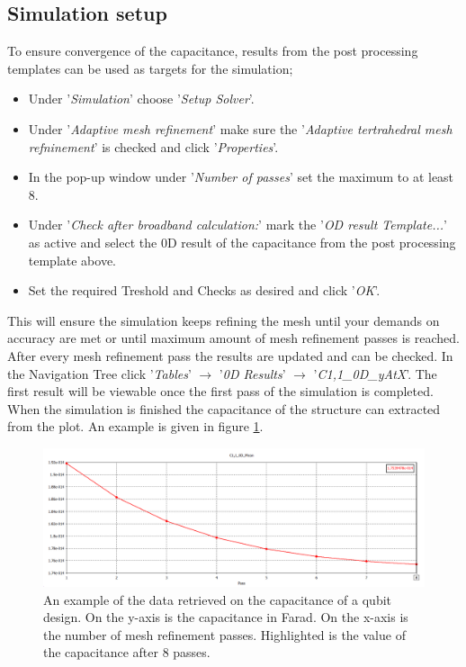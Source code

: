 \subsection{Simulation setup}
To ensure convergence of the capacitance, results from the post processing templates can be used as targets for the simulation;
\begin{itemize}
	\item Under '\textit{Simulation}' choose '\textit{Setup Solver}'.
	\item Under '\textit{Adaptive mesh refinement}' make sure the '\textit{Adaptive tertrahedral mesh refninement}' is checked and click '\textit{Properties}'.
	\item In the pop-up window under '\textit{Number of passes}' set the maximum to at least 8.
	\item Under '\textit{Check after broadband calculation:}' mark the '\textit{OD result Template...}' as active and select the 0D result of the capacitance from the post processing template above. 
	\item Set the required Treshold and Checks as desired and click '\textit{OK}'.
\end{itemize}
This will ensure the simulation keeps refining the mesh until your demands on accuracy are met or until maximum amount of mesh refinement passes is reached. After every mesh refinement pass the results are updated and can be checked. In the Navigation Tree click '\textit{Tables}' \(\rightarrow\) '\textit{0D Results}' \(\rightarrow\) '\textit{C1,1\_0D\_yAtX}'. The first result will be viewable once the first pass of the simulation is completed. When the simulation is finished the capacitance of the structure can extracted from the plot. An example is given in figure \ref{fig:capacitanceplot}.

\begin{figure}
	\includegraphics[width=\textwidth]{Figures/capacitanceplot}
	\caption{An example of the data retrieved on the capacitance of a qubit design. On the y-axis is the capacitance in Farad. On the x-axis is the number of mesh refinement passes. Highlighted is the value of the capacitance after 8 passes.}
	\label{fig:capacitanceplot}
\end{figure}

